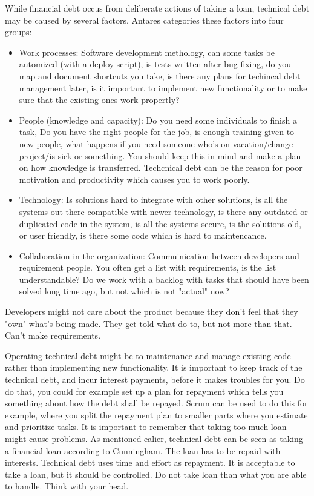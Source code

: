 While financial debt occus from deliberate actions of taking a loan, technical debt may be caused by several factors. Antares categories these factors into four groups:
\begin{itemize}
	\item Work processes: Software development methology, can some tasks be automized (with a deploy script), is tests written after bug fixing, do you map and document shortcuts you take, is there any plans for techincal debt management later, is it important to implement new functionality or to make sure that the existing ones work propertly?
	\item People (knowledge and capacity): Do you need some individuals to finish a task, Do you have the right people for the job, is enough training given to new people, what happens if you need someone who's on vacation/change project/is sick or something. You should keep this in mind and make a plan on how knowledge is transferred. Techcnical debt can be the reason for poor motivation and productivity which causes you to work poorly. 
	\item Technology: Is solutions hard to integrate with other solutions, is all the systems out there compatible with newer technology, is there any outdated or duplicated code in the system, is all the systems secure, is the solutions old, or user friendly, is there some code which is hard to maintencance. 
	\item Collaboration in the organization: Commuinication between developers and requirement people. You often get a list with requirements, is the list understandable? Do we work with a backlog with tasks that should have been solved long time ago, but not which is not "actual" now?
\end{itemize}
Developers might not care about the product because they don't feel that they "own" what's being made. They get told what do to, but not more than that. Can't make requirements.


Operating technical debt might be to maintenance and manage existing code rather than implementing new functionality. It is important to keep track of the technical debt, and incur interest payments, before it makes troubles for you. Do do that, you could for example set up a plan for repayment which tells you something about how the debt shall be repayed. Scrum can be used to do this for example, where you split the repayment plan to smaller parts where you estimate and prioritize tasks. It is important to remember that taking too much loan might cause problems. As mentioned ealier, technical debt can be seen as taking a financial loan according to Cunningham. The loan has to be repaid with interests. Technical debt uses time and effort as repayment. It is acceptable to take a loan, but it should be controlled. Do not take loan than what you are able to handle. Think with your head.

